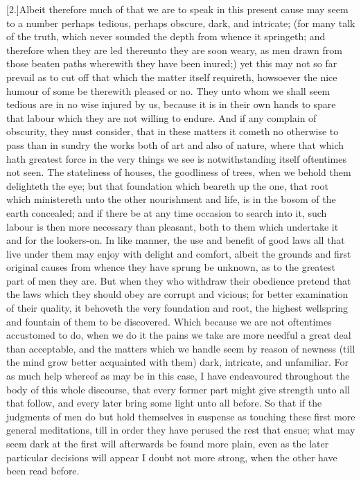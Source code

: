 [2.]Albeit therefore much of that we are to speak in this present cause may seem to a number perhaps tedious, perhaps obscure, dark, and intricate; (for many talk of the truth, which never sounded the depth from whence it springeth; and therefore when they are led thereunto they are soon weary, as men drawn from those beaten paths wherewith they have been inured;) yet this may not so far prevail as to cut off that which the matter itself requireth, howsoever the nice humour of some be therewith pleased or no. They unto whom we shall seem tedious are in no wise injured by us, because it is in their own hands to spare that labour which they are not willing to endure. And if any complain of obscurity, they must consider, that in these matters it cometh no otherwise to pass than in sundry the works both of art and also of nature, where that which hath greatest force in the very things we see is notwithstanding itself oftentimes not seen. The stateliness of houses, the goodliness of trees, when we behold them delighteth the eye;  but that foundation which beareth up the one, that root which ministereth unto the other nourishment and life, is in the bosom of the earth concealed; and if there be at any time occasion to search into it, such labour is then more necessary than pleasant, both to them which undertake it and for the lookers-on. In like manner, the use and benefit of good laws all that live under them may enjoy with delight and comfort, albeit the grounds and first original causes from whence they have sprung be unknown, as to the greatest part of men they are. But when they who withdraw their obedience pretend that the laws which they should obey are corrupt and vicious; for better examination of their quality, it behoveth the very foundation and root, the highest wellspring and fountain of them to be discovered. Which because we are not oftentimes accustomed to do, when we do it the pains we take are more needful a great deal than acceptable, and the matters which we handle seem by reason of newness (till the mind grow better acquainted with them) dark, intricate, and unfamiliar. For as much help whereof as may be in this case, I have endeavoured throughout the body of this whole discourse, that every former part might give strength unto all that follow, and every later bring some light unto all before. So that if the judgments of men do but hold themselves in suspense as touching these first more general meditations, till in order they have perused the rest that ensue; what may seem dark at the first will afterwards be found more plain, even as the later particular decisions will appear I doubt not more strong, when the other have been read before.


